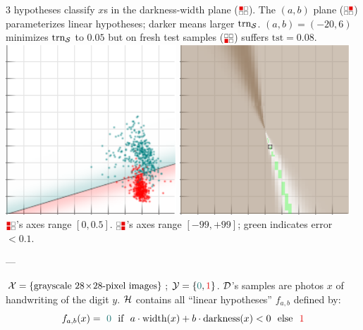 \documentclass[11pt, justified]{tufte-book}
\newcommand{\offour}[1]{
    {\tiny \raisebox{0.04cm}{\scalebox{0.9}{$\substack{
        \IfSubStr{#1}{0}{{\red\blacksquare}}{\square}   
        \IfSubStr{#1}{1}{{\red\blacksquare}}{\square} \\ 
        \IfSubStr{#1}{2}{{\red\blacksquare}}{\square}   
        \IfSubStr{#1}{3}{{\red\blacksquare}}{\square}   
    }$}}}%
}
\newcommand{\samsubsubsection}[1]{
   \vspace{0.1cm}
   \par\noindent{\hspace{-2cm}\normalsize \sc \gre #1} ---
}
\newcommand{\Ein}  {\text{trn}_{\sS}}
\newcommand{\Eout} {\text{tst}}
\theoremstyle{definition}
\begin{document}
\begin{marginfigure}
          $3$ hypotheses classify $x$s in the darkness-width plane
          ($\offour{0}$).  The $(a,b)$ plane ($\offour{1}$) parameterizes
          linear hypotheses; darker means larger $\Ein$.  $(a,b)=(-20,6)$
          minimizes $\Ein$ to $0.05$ but on fresh test samples ($\offour{2}$)
          suffers $\Eout=0.08$.   
          \includegraphics[width=0.48\textwidth]{test.png}%
          \hspace{0.03\textwidth}%
          \includegraphics[width=0.48\textwidth]{test-scat.png}
          $\offour{02}$'s axes range $[0, 0.5]$.
          $\offour{13}$'s axes range $[-99,+99]$; green indicates error $<0.1$.
      \end{marginfigure}
    \samsubsubsection{tiny example}
      $\mathcal{X} = \{\text{grayscale~}28\!\times\!28\text{-pixel images}\}$; $\yY=\{{\cya{0}},{\red{1}}\}$. %
      $\mathcal{D}$'s samples are photos $x$ of 
      handwriting of the digit $y$. %
      $\mathcal{H}$ contains all ``linear hypotheses'' $f_{a,b}$ %
      defined by:
      $$
        f_{a,b}(x) = ~{\cya{0}} \text{~~if~~} a\cdot \text{width}(x) + b\cdot\text{darkness}(x) < 0 \text{~~else~~} {\red{1}} 
      $$ 
\end{document}

